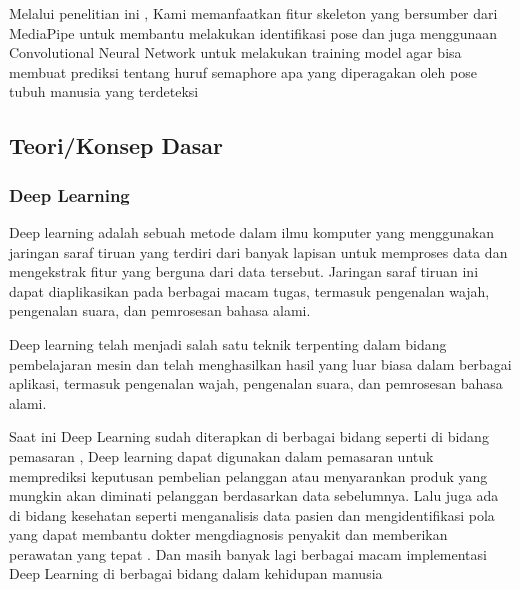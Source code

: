 Melalui penelitian ini , Kami memanfaatkan fitur skeleton yang bersumber dari MediaPipe untuk membantu melakukan identifikasi pose dan juga menggunaan Convolutional Neural Network untuk melakukan training model agar bisa membuat prediksi tentang huruf semaphore apa yang diperagakan oleh pose tubuh manusia yang terdeteksi

\subsection{Teori/Konsep Dasar}

\subsubsection{Deep Learning}

Deep learning adalah sebuah metode dalam ilmu komputer yang menggunakan jaringan saraf tiruan yang terdiri dari banyak lapisan untuk memproses data dan mengekstrak fitur yang berguna dari data tersebut. Jaringan saraf tiruan ini dapat diaplikasikan pada berbagai macam tugas, termasuk pengenalan wajah, pengenalan suara, dan pemrosesan bahasa alami.

Deep learning telah menjadi salah satu teknik terpenting dalam bidang pembelajaran mesin dan telah menghasilkan hasil yang luar biasa dalam berbagai aplikasi, termasuk pengenalan wajah, pengenalan suara, dan pemrosesan bahasa alami.

Saat ini Deep Learning sudah diterapkan di berbagai bidang seperti di bidang pemasaran , Deep learning dapat digunakan dalam pemasaran untuk memprediksi keputusan pembelian pelanggan atau menyarankan produk yang mungkin akan diminati pelanggan berdasarkan data sebelumnya. Lalu juga ada di bidang kesehatan seperti  menganalisis data pasien dan mengidentifikasi pola yang dapat membantu dokter mengdiagnosis penyakit dan memberikan perawatan yang tepat . Dan masih banyak lagi berbagai macam implementasi Deep Learning di berbagai bidang dalam kehidupan manusia 

